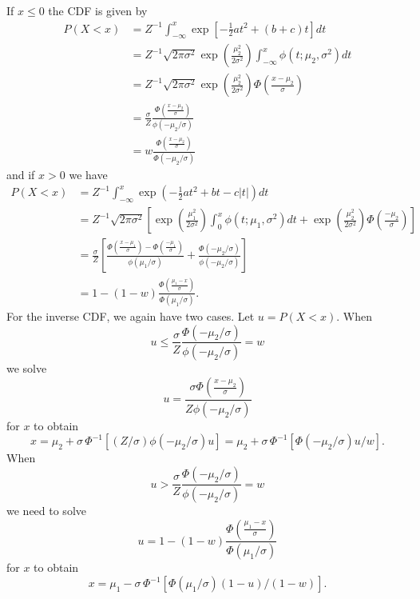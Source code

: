 \documentclass[11pt]{article}
\begin{document}
If $x\le 0$ the CDF is given by
$$
\begin{array}{rl} 
P(X < x) 
&  = Z^{-1} \int_{-\infty}^x \exp\left[ -\tfrac{1}{2}at^2 + (b + c)t \right] dt 
\\ [2ex]
& = Z^{-1} \sqrt{2\pi\sigma^2} \exp\left( \frac{\mu_2^2}{2\sigma^2} \right) \int_{-\infty}^x \phi(t;\mu_2,\sigma^2) dt
\\ [2ex]
& = Z^{-1} \sqrt{2\pi\sigma^2} \exp\left( \frac{\mu_2^2}{2\sigma^2} \right) \Phi\left( \frac{x - \mu_2}{\sigma} \right)
\\ [2ex]
& =  \frac{\sigma}{Z}\frac{ \Phi\left( \frac{x - \mu_2}{\sigma} \right)}{\phi(-\mu_2/\sigma)}
\\ [2ex]
& = w\frac{\Phi\left( 
\frac{x - \mu_2}{\sigma}\right)}{\Phi(-\mu_2/\sigma)} 

\end{array} 
$$
and if $x>0$ we have
$$
\begin{array}{rl}
P(X < x)
&  = Z^{-1}\int_{-\infty}^x \exp\left( -\tfrac{1}{2}at^2 + bt - c|t| \right) dt
\\ [2ex]
& 
= Z^{-1} \sqrt{2\pi\sigma^2}
\left[  \exp\left(  \frac{\mu_1^2}{2\sigma^2} \right) \int_0^x \phi(t;\mu_1,\sigma^2) dt
+      \exp\left(  \frac{\mu_2^2}{2\sigma^2} \right) \Phi\left( \frac{-\mu_2}{\sigma} \right)  
\right] 
\\ [2ex]
&  = \frac{\sigma}{Z} 
\left[  \frac{ 
\Phi\left( \frac{x - \mu_1}{\sigma} \right) - \Phi\left( \frac{ - \mu_1}{\sigma} \right)}{\phi(\mu_1/\sigma)}
+       \frac{\Phi\left( -\mu_2/\sigma \right)}{\phi(-\mu_2/\sigma)}  
\right] 
\\ [2ex]
&  = \displaystyle 1 - (1 - w)\frac{\Phi(\frac{\mu_1 - x}{\sigma})}{\Phi(\mu_1/\sigma)}.

\end{array} 
$$
For the inverse CDF, we again have two cases. Let $u = P(X<x)$. When 
$$
u \le \frac{\sigma}{Z}  \frac{ \Phi\left(  - \mu_2/\sigma \right)}{\phi(-\mu_2/\sigma)} = w
$$ 
we solve
$$
u = \frac{ \sigma \Phi\left( \frac{x - \mu_2}{\sigma} \right)}{Z \phi(-\mu_2/\sigma)}
$$
for $x$ to obtain
$$
x = \mu_2 + \sigma \,\Phi^{-1}\left[ (Z/\sigma) \phi(-\mu_2/\sigma) u \right] = \mu_2 + \sigma \,\Phi^{-1}\left[ \Phi(-\mu_2/\sigma) u /w\right].
$$ 
When 
$$
u > \frac{\sigma}{Z}  \frac{ \Phi\left(  - \mu_2/\sigma \right)}{\phi(-\mu_2/\sigma)} = w
$$ 
we need to solve
$$
u = \displaystyle 1 - (1 - w)\frac{\Phi(\frac{\mu_1 - x}{\sigma})}{\Phi(\mu_1/\sigma)}
$$
for $x$ to obtain
$$
x = \mu_1 - \sigma\, \Phi^{-1}\left[ \Phi(\mu_1/\sigma) (1-u)/(1-w) \right]. 
$$
\end{document}
